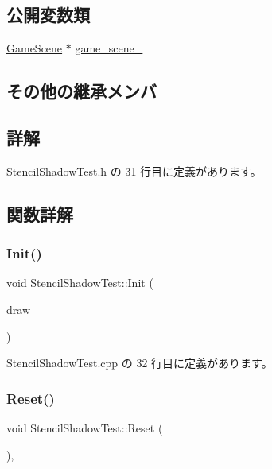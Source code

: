 \subsection*{公開変数類}
\begin{DoxyCompactItemize}
\item 
\mbox{\hyperlink{class_game_scene}{Game\+Scene}} $\ast$ \mbox{\hyperlink{class_stencil_shadow_test_ac108faf317516a8335f73ca8005fbb20}{game\+\_\+scene\+\_\+}}
\end{DoxyCompactItemize}
\subsection*{その他の継承メンバ}


\subsection{詳解}


 Stencil\+Shadow\+Test.\+h の 31 行目に定義があります。



\subsection{関数詳解}
\mbox{\label{class_stencil_shadow_test_a4a58695fafd134d750eb23ee5ec2bdb6}} 
\subsubsection{\texorpdfstring{Init()}{Init()}}
{\footnotesize\ttfamily void Stencil\+Shadow\+Test\+::\+Init (\begin{DoxyParamCaption}\item[{\mbox{\hyperlink{class_draw_base}{Draw\+Base}} $\ast$}]{draw }\end{DoxyParamCaption})}



 Stencil\+Shadow\+Test.\+cpp の 32 行目に定義があります。

\mbox{\label{class_stencil_shadow_test_a7691120143c64b99d6c8f5391be56e83}} 
\subsubsection{\texorpdfstring{Reset()}{Reset()}}
{\footnotesize\ttfamily void Stencil\+Shadow\+Test\+::\+Reset (\begin{DoxyParamCaption}{ }\end{DoxyParamCaption})\hspace{0.3cm}{\ttfamily [override]}, {\ttfamily [virtual]}}



